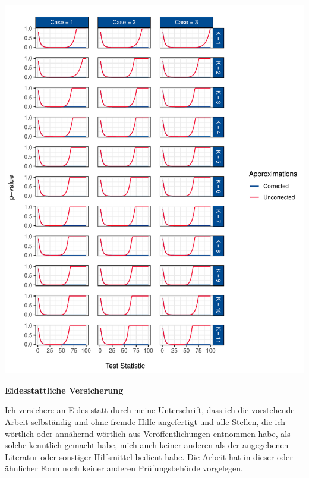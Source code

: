 \documentclass[12pt,a4paper]{article}
\let\origfigure\figure
\let\endorigfigure\endfigure
\renewenvironment{figure}[1][2] {
    \expandafter\origfigure\expandafter[H]
} {
    \endorigfigure
}
\begin{document}
\begin{figure}
\centering
\includegraphics{p_approx_paper_files/figure-latex/p_stat_e_j-1.pdf}
\caption{\label{fig:fig_4} Corrected and uncorrected \(p\)-value
predictions for the first case using Johansen and Engel-Granger as
underlying tests.}
\end{figure}

\restoregeometry

\cleardoublepage
\newpage
\renewcommand*{\mkbibnamefamily}[1]{\textbf{#1}}
\renewcommand*{\mkbibnamegiven}[1]{\textbf{#1}}
\renewcommand*{\mkbibnameprefix}[1]{\textbf{#1}}
\renewcommand*{\mkbibnamesuffix}[1]{\textbf{#1}}




\newpage
\textbf{Eidesstattliche Versicherung}

\bigskip

Ich versichere an Eides statt durch meine Unterschrift, dass ich die vorstehende Arbeit selbständig und ohne fremde Hilfe angefertigt und alle Stellen, die ich wörtlich oder annähernd wörtlich aus Veröffentlichungen entnommen habe, als solche kenntlich gemacht habe, mich auch keiner anderen als der angegebenen Literatur oder sonstiger Hilfsmittel bedient habe. Die Arbeit hat in dieser oder ähnlicher Form noch keiner anderen Prüfungsbehörde vorgelegen.

\vspace{1cm}
\rule{0pt}{2\baselineskip} %
\par\noindent{} \hfill\makebox[2.25in]{\hrulefill}%
\par\noindent\makebox[2.25in][l]{} \hfill{}%
\end{document}
